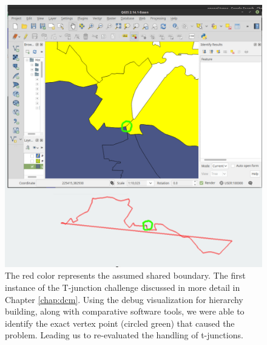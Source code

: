 \begin{figure}
\includegraphics[width=1\textwidth]{images/ch6/currentProblem}
\caption{The red color represents the assumed shared boundary. The first instance of the T-junction challenge discussed in more detail in Chapter \ref{chap:dcm}.  Using the debug visualization for hierarchy building, along with comparative software tools, we were able to identify the exact vertex point (circled green) that caused the problem. Leading us to re-evaluated the handling of t-junctions. }\label{fig:t-junction}
\end{figure} 

